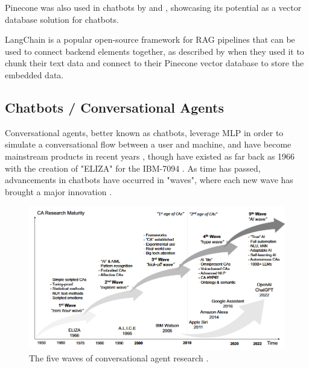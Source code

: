 \documentclass[12pt]{report}
\begin{document}
    Pinecone was also used in chatbots by \textcite{odede_jaybot_2024} and \textcite{singer_development_2024}, showcasing its potential as a vector database solution
    for chatbots.

    LangChain \autocite{langchain_introduction_nodate} is a popular open-source framework for RAG pipelines that can be used to connect backend elements 
    together, as described by \textcite{singer_development_2024} when they used it to chunk their text data and connect to their Pinecone vector database to store 
    the embedded data. 
    


    \subsection{Chatbots / Conversational Agents}

    Conversational agents, better known as chatbots, leverage MLP in order to simulate a conversational flow 
    between a user and machine, and have become mainstream products in recent years \autocite{liao_all_2018},
    though have existed as far back as 1966 with the creation of "ELIZA" for the IBM-7094 \autocite{weizenbaum_elizacomputer_1966}.
    As time has passed, advancements in chatbots have occurred in "waves", where each new wave has brought a major innovation \autocite{schobel_charting_2024}.

    \begin{figure}[H] 
        \centering
        \includegraphics[width=.8\linewidth]{ChatbotWaves.png}
        \caption{The five waves of conversational agent research \autocite{schobel_charting_2024}.}
        \label{fig:ChatbotWaves}
    \end{figure}
\end{document}
